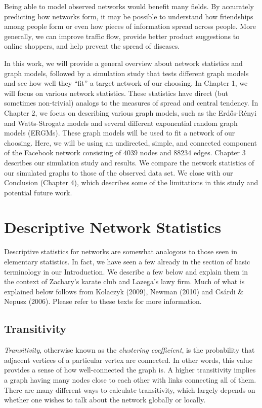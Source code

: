 \documentclass[12pt,twoside]{amherstthesis}
\begin{document}
  Being able to model observed networks would benefit many fields. By
  accurately predicting how networks form, it may be possible to
  understand how friendships among people form or even how pieces of
  information spread across people. More generally, we can improve traffic
  flow, provide better product suggestions to online shoppers, and help
  prevent the spread of diseases.
  
  In this work, we will provide a general overview about network
  statistics and graph models, followed by a simulation study that tests
  different graph models and see how well they ``fit'' a target network of
  our choosing. In Chapter 1, we will focus on various network statistics.
  These statistics have direct (but sometimes non-trivial) analogs to the
  measures of spread and central tendency. In Chapter 2, we focus on
  describing various graph models, such as the Erdős-Rényi and
  Watts-Strogatz models and several different exponential random graph
  models (ERGMs). These graph models will be used to fit a network of our
  choosing. Here, we will be using an undirected, simple, and connected
  component of the Facebook network consisting of \(4039\) nodes and
  \(88234\) edges. Chapter 3 describes our simulation study and results.
  We compare the network statistics of our simulated graphs to those of
  the observed data set. We close with our Conclusion (Chapter 4), which
  describes some of the limitations in this study and potential future
  work.
  
  \chapter{Descriptive Network
  Statistics}\label{descriptive-network-statistics}
  
  Descriptive statistics for networks are somewhat analogous to those seen
  in elementary statistics. In fact, we have seen a few already in the
  section of basic terminology in our Introduction. We describe a few
  below and explain them in the context of Zachary's karate club and
  Lazega's lawy firm. Much of what is explained below follows from
  Kolaczyk (2009), Newman (2010) and Csárdi \& Nepusz (2006). Please refer
  to these texts for more information.
  
  \section{Transitivity}\label{transitivity}
  
  \emph{Transitivity}, otherwise known as the \emph{clustering
  coefficient}, is the probability that adjacent vertices of a particular
  vertex are connected. In other words, this value provides a sense of how
  well-connected the graph is. A higher transitivity implies a graph
  having many nodes close to each other with links connecting all of them.
  There are many different ways to calculate transitivity, which largely
  depends on whether one wishes to talk about the network globally or
  locally.
  
\end{document}
